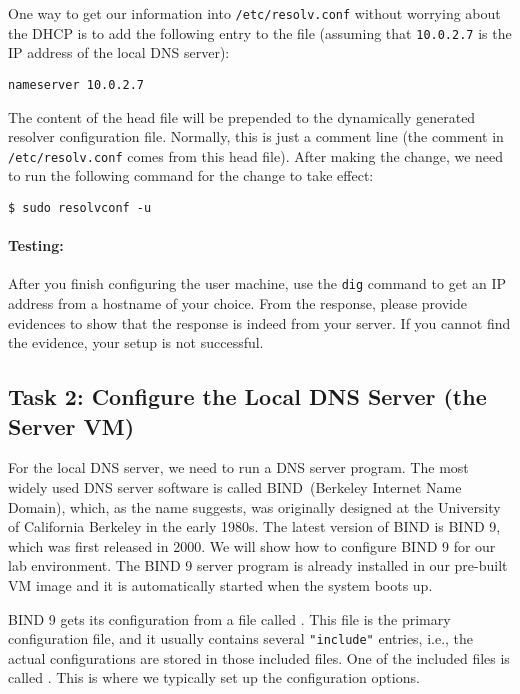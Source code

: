 One way to get our information into \texttt{/etc/resolv.conf} without worrying about
the DHCP is to add the following entry to the 
file (assuming that \texttt{10.0.2.7} is the IP address of the local DNS server):

\begin{lstlisting}
nameserver 10.0.2.7
\end{lstlisting}


The content of the head file will be prepended to the dynamically generated resolver
configuration file. Normally, this is just a comment line (the comment in
\texttt{/etc/resolv.conf} comes from this head file). After making the change,
we need to run the following command for the change to take effect:

\begin{lstlisting}
$ sudo resolvconf -u
\end{lstlisting}



\paragraph{Testing:}
After you finish configuring the user machine, use the \texttt{dig} command
to get an IP address from a hostname of your choice. From the response, please provide
evidences to show that the response is indeed from your server. If you cannot find the
evidence, your setup is not successful.



\subsection{Task 2: Configure the Local DNS Server (the Server VM)} 


For the local DNS server, we need to run a DNS server program.  The most
widely used DNS server software is called BIND~(Berkeley Internet Name
Domain), which, as the name suggests, was originally designed at the
University of California Berkeley in the early 1980s.  The latest version
of BIND is BIND 9, which was first released in 2000. We will show how to
configure BIND 9 for our lab environment.
The BIND 9 server program is already installed in our pre-built
\ubuntu VM image and it is automatically started when the 
system boots up.


BIND 9 gets its configuration from a file called . This file
is the primary configuration file, and it usually contains several \texttt{"include"}
entries, i.e., the actual configurations are stored in those included files. One of the
included files is called . This is where we typically set up
the configuration options. 


